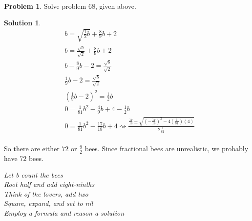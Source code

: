 \documentclass[10pt]{article}
\theoremstyle{definition}
\newtheorem{problem}{Problem}
\newtheorem{soln}{Solution}
\begin{document}
\begin{problem}
Solve problem 68, given above.
\end{problem}
\begin{soln} ~\\
    \begin{align*}
         & b = \sqrt{\frac{1}{2}b} + \frac{8}{9}b + 2                                                                                                          \\
         & b = \frac{\sqrt{b}}{\sqrt{2}} + \frac{8}{9}b + 2                                                                                                    \\
         & b - \frac{8}{9}b - 2 = \frac{\sqrt{b}}{\sqrt{2}}                                                                                                    \\
         & \frac{1}{9}b - 2 = \frac{\sqrt{b}}{\sqrt{2}}                                                                                                        \\
         & (\frac{1}{9}b - 2)^2 = \frac{1}{2}b                                                                                                                 \\
         & 0 = \frac{1}{81}b^2-\frac{4}{9}b+4 - \frac{1}{2}b                                                                                                   \\
         & 0 = \frac{1}{81}b^2-\frac{17}{18}b+4 \rightsquigarrow \frac{\frac{17}{18}\pm\sqrt{\left(-\frac{17}{18}\right)^2-4(\frac{1}{81})(4)}}{2\frac{1}{81}} \\
    \end{align*}

    \noindent So there are either $72$ or $\frac{9}{2}$ bees. Since fractional bees are unrealistic, we probably have $72$ bees.

    \begin{center}
        \textit{
            Let b count the bees \\
            Root half and add eight-ninths \\
            Think of the lovers, add two \\
            Square, expand, and set to nil \\
            Employ a formula and reason a solution \\
        }
    \end{center}
\end{soln}


\end{document}
